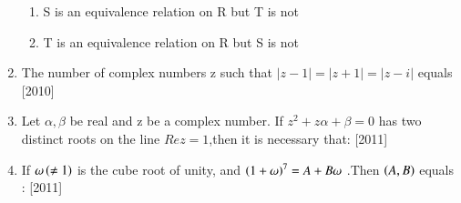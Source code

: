 \documentclass[journal,12pt,twocolumn,article]{IEEEtran}
\theoremstyle{remark}
\begin{document}
\begin{enumerate}[start = 14]
\begin{enumerate}
\item S is an equivalence relation on R but T is not
\item T is an equivalence relation on R but S is not

\end{enumerate}

\item The number of complex numbers z such that $|z-1|=|z+1|=|z-i|$ equals
\hfill{[2010]}

\begin{enumerate}
\end{enumerate}

\item Let $\alpha,\beta$ be real and z be a complex number. If $z^2 +z\alpha +\beta =0$  has two distinct roots on the line $Rez=1$,then it is necessary that:
\hfill{[2011]}
\begin{enumerate}
\end{enumerate}

\item If $\omega \left(\neq1\right)$ is the cube root of unity, and $\left(1+\omega \right)^7= A+ B\omega$ .Then $\left(A,B\right)$ equals :
\hfill{[2011]}                                     

\begin{enumerate}                                  
\end{enumerate}


\end{enumerate}
\end{document}
